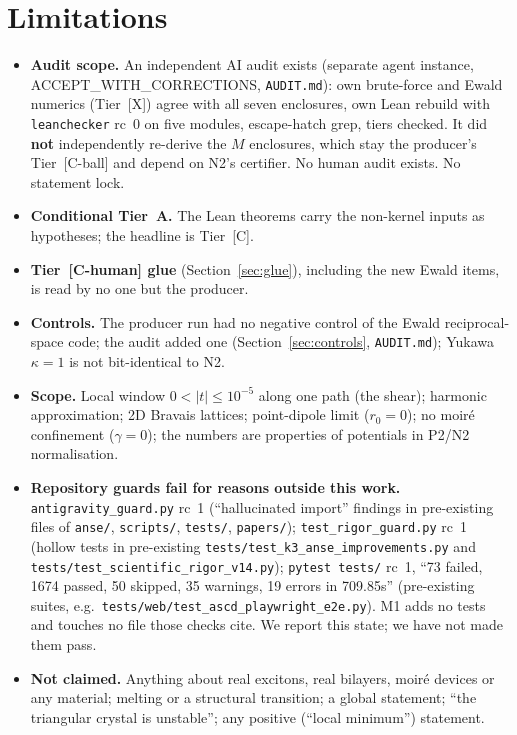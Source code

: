 \documentclass[11pt]{article}
\newcommand{\tier}[1]{\textsf{[#1]}}
\newcommand{\tC}{\tier{C}}
\newcommand{\tCb}{\tier{C-ball}}
\newcommand{\tCh}{\tier{C-human}}
\newcommand{\tX}{\tier{X}}
\begin{document}
\section{Limitations}\label{sec:lim}
\begin{itemize}\itemsep=1pt
\item \textbf{Audit scope.} An independent AI audit exists (separate agent instance, ACCEPT\_WITH\_CORRECTIONS, \texttt{AUDIT.md}): own brute-force and Ewald numerics (Tier~\tX{}) agree with all seven enclosures, own Lean rebuild with \texttt{leanchecker} rc~0 on five modules, escape-hatch grep, tiers checked. It did \textbf{not} independently re-derive the $M$ enclosures, which stay the producer's Tier~\tCb{} and depend on N2's certifier. No human audit exists. No statement lock.
\item \textbf{Conditional Tier~A.} The Lean theorems carry the non-kernel inputs as hypotheses; the headline is Tier~\tC.
\item \textbf{Tier~\tCh{} glue} (Section~\ref{sec:glue}), including the new Ewald items, is read by no one but the producer.
\item \textbf{Controls.} The producer run had no negative control of the Ewald reciprocal-space code; the audit added one (Section~\ref{sec:controls}, \texttt{AUDIT.md}); Yukawa $\kappa=1$ is not bit-identical to N2.
\item \textbf{Scope.} Local window $0<|t|\le10^{-5}$ along one path (the shear); harmonic approximation; 2D Bravais lattices; point-dipole limit ($r_0=0$); no moir\'e confinement ($\gamma=0$); the numbers are properties of potentials in P2/N2 normalisation.
\item \textbf{Repository guards fail for reasons outside this work.} \texttt{antigravity\_guard.py} rc~1 (``hallucinated import'' findings in pre-existing files of \texttt{anse/}, \texttt{scripts/}, \texttt{tests/}, \texttt{papers/}); \texttt{test\_rigor\_guard.py} rc~1 (hollow tests in pre-existing \texttt{tests/test\_k3\_anse\_improvements.py} and \texttt{tests/test\_scientific\_rigor\_v14.py}); \texttt{pytest tests/} rc~1, ``73 failed, 1674 passed, 50 skipped, 35 warnings, 19 errors in 709.85s'' (pre-existing suites, e.g.\ \texttt{tests/web/test\_ascd\_playwright\_e2e.py}). M1 adds no tests and touches no file those checks cite. We report this state; we have not made them pass.
\item \textbf{Not claimed.} Anything about real excitons, real bilayers, moir\'e devices or any material; melting or a structural transition; a global statement; ``the triangular crystal is unstable''; any positive (``local minimum'') statement.
\end{itemize}
\end{document}
